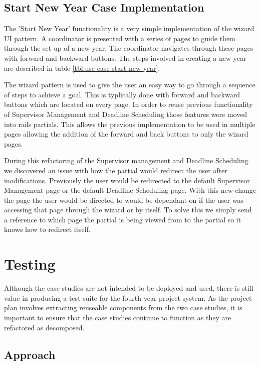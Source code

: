 \documentclass[document.tex]{subfiles}
\begin{document}
\FloatBarrier

\subsection {Start New Year Case Implementation}

The 'Start New Year' functionality is a very simple implementation of the wizard UI pattern. A coordinator is presented with a series of pages to guide them through the set up of a new year. The coordinator navigates through these pages with forward and backward buttons. The steps involved in creating a new year are described in table \ref{tbl:use-case-start-new-year}. 

The wizard pattern is used to give the user an easy way to go through a sequence of steps to achieve a goal. This is typlically done with forward and backward buttons which are located on every page. In order to reuse previous functionality of Supervisor Management and Deadline Scheduling those features were moved into rails partials. This allows the previous implementation to be used in multiple pages allowing the addition of the forward and back buttons to only the wizard pages.

During this refactoring of the Supervisor management and Deadline Scheduling we discovered an issue with how the partial would redirect the user after modifications. Previously the user would be redirected to the default Supervisor Management page or the default Deadline Scheduling page. With this new change the page the user would be directed to would be dependant on if the user was accessing that page through the wizard or by itself. To solve this we simply send a reference to which page the partial is being viewed from to the partial so it knows how to redirect itself.


\section {Testing}

Although the case studies are not intended to be deployed and used, there is still value in producing a test suite for the fourth year project system.
As the project plan involves extracting reuseable components from the two case studies, it is important to ensure that the case studies continue to function as they are refactored as decomposed.


\subsection {Approach}
\end{document}
